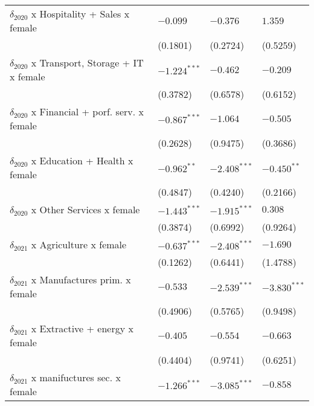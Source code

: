 \begin{table}[h!]
{{\begin{tabular}{llll}
$\delta_{2020}$ x Hospitality + Sales x female     &           $-0.099$ &           $-0.376$ &            $1.359$ \\
                                                   &           (0.1801) &           (0.2724) &           (0.5259) \\
$\delta_{2020}$ x Transport, Storage + IT x female &     $-1.224^{***}$ &           $-0.462$ &           $-0.209$ \\
                                                   &           (0.3782) &           (0.6578) &           (0.6152) \\
$\delta_{2020}$ x Financial + porf. serv. x female &     $-0.867^{***}$ &           $-1.064$ &           $-0.505$ \\
                                                   &           (0.2628) &           (0.9475) &           (0.3686) \\
$\delta_{2020}$ x Education + Health x female      &      $-0.962^{**}$ &     $-2.408^{***}$ &      $-0.450^{**}$ \\
                                                   &           (0.4847) &           (0.4240) &           (0.2166) \\
$\delta_{2020}$ x Other Services x female          &     $-1.443^{***}$ &     $-1.915^{***}$ &            $0.308$ \\
                                                   &           (0.3874) &           (0.6992) &           (0.9264) \\
$\delta_{2021}$ x Agriculture x female             &     $-0.637^{***}$ &     $-2.408^{***}$ &           $-1.690$ \\
                                                   &           (0.1262) &           (0.6441) &           (1.4788) \\
$\delta_{2021}$ x Manufactures prim. x female      &           $-0.533$ &     $-2.539^{***}$ &     $-3.830^{***}$ \\
                                                   &           (0.4906) &           (0.5765) &           (0.9498) \\
$\delta_{2021}$ x Extractive + energy x female     &           $-0.405$ &           $-0.554$ &           $-0.663$ \\
                                                   &           (0.4404) &           (0.9741) &           (0.6251) \\
$\delta_{2021}$ x manifuctures sec. x female       &     $-1.266^{***}$ &     $-3.085^{***}$ &           $-0.858$ \\

\end{tabular}}}
\end{table}
